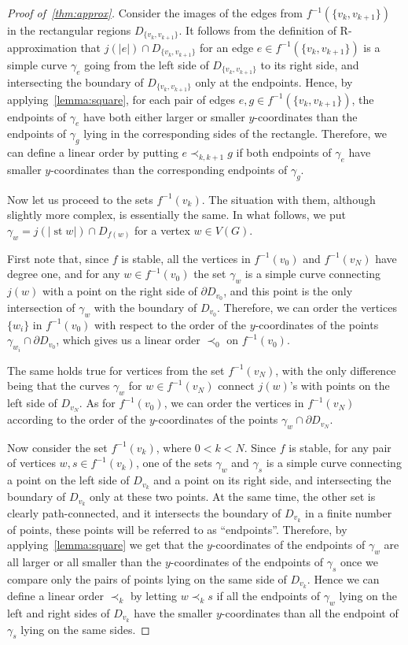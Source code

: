 \documentclass[a4paper,12pt,reqno,oneside]{amsart}
\theoremstyle{plain}
\theoremstyle{definition}
\theoremstyle{plain}
\DeclareMathOperator{\st}{st}
\begin{document}
\begin{proof}[Proof of~\cref{thm:approx}]
  Consider the images of the edges from $f^{-1}(\{v_k, v_{k+1}\})$ in the rectangular regions
  $D_{\{v_k, v_{k+1}\}}$. It follows from the definition of R-approximation that
  $j(|e|) \cap D_{\{v_k, v_{k+1}\}}$ for an edge $e \in f^{-1}(\{v_k, v_{k+1}\})$ is a simple curve
  $\gamma_e$ going from the left side of $D_{\{v_k, v_{k+1}\}}$ to its right side, and intersecting
  the boundary of $D_{\{v_k, v_{k+1}\}}$ only at the endpoints. Hence, by
  applying~\cref{lemma:square}, for each pair of edges $e, g \in f^{-1}(\{v_k, v_{k+1}\})$, the
  endpoints of $\gamma_e$ have both either larger or smaller $y$-coordinates than the endpoints of
  $\gamma_g$ lying in the corresponding sides of the rectangle. Therefore, we can define a linear
  order by putting $e \prec_{k, k+1} g$ if both endpoints of $\gamma_e$ have smaller $y$-coordinates
  than the corresponding endpoints of $\gamma_g$.

  Now let us proceed to the sets $f^{-1}(v_k)$. The situation with them, although slightly more
  complex, is essentially the same. In what follows, we put $\gamma_w = j(|\st w|) \cap D_{f(w)}$
  for a vertex $w \in V(G)$.

  First note that, since $f$ is stable, all the vertices in $f^{-1}(v_0)$ and $f^{-1}(v_N)$ have
  degree one, and for any $w \in f^{-1}(v_0)$ the set $\gamma_w$ is a simple curve connecting $j(w)$
  with a point on the right side of $\partial D_{v_0}$, and this point is the only intersection of
  $\gamma_w$ with the boundary of $D_{v_0}$. Therefore, we can order the vertices $\{ w_i \}$ in
  $f^{-1}(v_0)$ with respect to the order of the $y$-coordinates of the points
  $\gamma_{w_i} \cap \partial D_{v_0}$, which gives us a linear order $\prec_0$ on $f^{-1}(v_0)$.

  The same holds true for vertices from the set $f^{-1}(v_N)$, with the only difference being that
  the curves $\gamma_w$ for $w \in f^{-1}(v_N)$ connect $j(w)$'s with points on the left side of
  $D_{v_N}$. As for $f^{-1}(v_0)$, we can order the vertices in $f^{-1}(v_N)$ according to the order
  of the $y$-coordinates of the points $\gamma_w \cap \partial D_{v_N}$.

  Now consider the set $f^{-1}(v_k)$, where $0 < k < N$. Since $f$ is stable, for any pair of
  vertices $w, s \in f^{-1}(v_k)$, one of the sets $\gamma_w$ and $\gamma_s$ is a simple curve
  connecting a point on the left side of $D_{v_k}$ and a point on its right side, and intersecting
  the boundary of $D_{v_k}$ only at these two points. At the same time, the other set is clearly
  path-connected, and it intersects the boundary of $D_{v_k}$ in a finite number of points, these
  points will be referred to as ``endpoints''. Therefore, by applying~\cref{lemma:square} we get
  that the $y$-coordinates of the endpoints of $\gamma_w$ are all larger or all smaller than the
  $y$-coordinates of the endpoints of $\gamma_s$ once we compare only the pairs of points lying on
  the same side of $D_{v_k}$. Hence we can define a linear order $\prec_k$ by letting $w \prec_k s$
  if all the endpoints of $\gamma_w$ lying on the left and right sides of $D_{v_k}$ have the smaller
  $y$-coordinates than all the endpoint of $\gamma_s$ lying on the same sides.


\end{proof}
\end{document}
